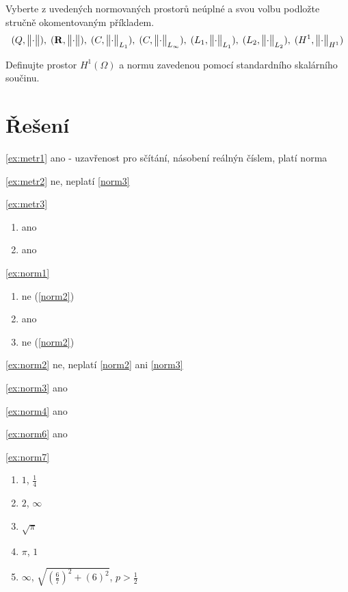 \documentclass[a4paper,10pt]{book}
\def\Real{{\rm\bf R}}
\def\norm#1{\bigl\Vert#1\bigr\Vert} %
\begin{document}
\exercise \label{ex:sp1} Vyberte z uvedených normovaných prostorů neúplné a svou volbu podložte stručně okomentovaným příkladem. 
\[(Q,\norm{\cdot}),\; (\Real,\norm{\cdot}),\; (C,\norm{\cdot}_{L_1}),\;
      (C,\norm{\cdot}_{L_\infty}),\; (L_1,\norm{\cdot}_{L_1}),\; (L_2,\norm{\cdot}_{L_2}),\; (H^1,\norm{\cdot}_{H^1})\]

      
\exercise \label{ex:sp2} Definujte prostor $H^1(\Omega)$ a normu zavedenou pomocí standardního skalárního součinu.


\section{Řešení}

\ref{ex:metr1} ano - uzavřenost pro sčítání, násobení reálnýn číslem, platí norma

\ref{ex:metr2} ne, neplatí \ref{norm3}

\ref{ex:metr3}
\begin{enumerate}[label={\alph*)},itemsep=-5pt, topsep=-7pt]
\item ano
\item ano
\end{enumerate}

\ref{ex:norm1}
\begin{enumerate}[label={\alph*)},itemsep=-5pt, topsep=-7pt]
\item ne (\ref{norm2})
\item ano
\item ne (\ref{norm2})
\end{enumerate}

\ref{ex:norm2} ne, neplatí \ref{norm2} ani \ref{norm3}

\ref{ex:norm3} ano

\ref{ex:norm4} ano

\ref{ex:norm6} ano

\ref{ex:norm7}
\begin{enumerate}[label=\alph*), itemsep=-3pt, topsep=-7pt]
  \item $1$, $\frac14$
  \item $2$, $\infty$
  \item $\sqrt{\pi}$
  \item $\pi$, $1$
  \item $\infty$, $\sqrt{(\frac67)^2+(6)^2}$, $p>\frac12$
\end{enumerate}
\end{document}
